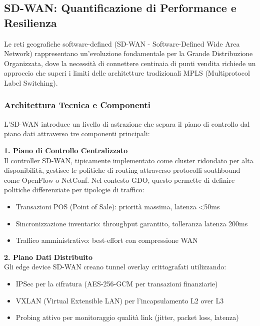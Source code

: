 \subsection{\texorpdfstring{\textbf{SD-WAN: Quantificazione di Performance e Resilienza}}{3.3.1 - SD-WAN: Quantificazione di Performance e Resilienza}}

Le reti geografiche software-defined (SD-WAN - Software-Defined Wide Area Network) rappresentano un'evoluzione fondamentale per la Grande Distribuzione Organizzata, dove la necessità di connettere centinaia di punti vendita richiede un approccio che superi i limiti delle architetture tradizionali MPLS (Multiprotocol Label Switching).

\subsubsection{\texorpdfstring{\textbf{Architettura Tecnica e Componenti}}{3.3.1.1 - Architettura Tecnica e Componenti}}

L'SD-WAN introduce un livello di astrazione che separa il piano di controllo dal piano dati attraverso tre componenti principali:

\textbf{1. Piano di Controllo Centralizzato}\\
Il controller SD-WAN, tipicamente implementato come cluster ridondato per alta disponibilità, gestisce le politiche di routing attraverso protocolli southbound come OpenFlow o NetConf. Nel contesto GDO, questo permette di definire politiche differenziate per tipologie di traffico:
\begin{itemize}
    \item Transazioni POS (Point of Sale): priorità massima, latenza <50ms
    \item Sincronizzazione inventario: throughput garantito, tolleranza latenza 200ms
    \item Traffico amministrativo: best-effort con compressione WAN
\end{itemize}

\textbf{2. Piano Dati Distribuito}\\
Gli edge device SD-WAN creano tunnel overlay crittografati utilizzando:
\begin{itemize}
    \item IPSec per la cifratura (AES-256-GCM per transazioni finanziarie)
    \item VXLAN (Virtual Extensible LAN) per l'incapsulamento L2 over L3
    \item Probing attivo per monitoraggio qualità link (jitter, packet loss, latenza)
\end{itemize}

